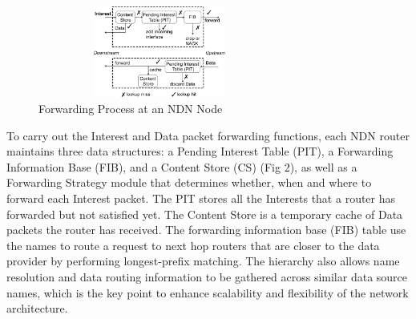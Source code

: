\begin{figure}
\centering
\includegraphics[height=3cm, width=8cm]{figs/process2.png}
\caption{\label{fig:process2}Forwarding Process at an NDN Node~\cite{ndn}}
\end{figure}

To carry out the Interest and Data packet forwarding functions, each NDN router maintains three data structures: a Pending Interest Table (PIT), a Forwarding Information Base (FIB), and a Content Store (CS) (Fig 2), as well as a Forwarding Strategy module that determines whether, when and where to forward each Interest packet. The PIT stores all the Interests that a router has forwarded but not satisfied yet. The Content Store is a temporary cache of Data packets the router has received. The forwarding information base (FIB) table use the names to route a request to next  hop routers that are closer to the data provider by performing longest-prefix matching. The hierarchy also allows name resolution and data routing information to be gathered across similar data source names, which is the key point to enhance scalability and flexibility of the network architecture. 




